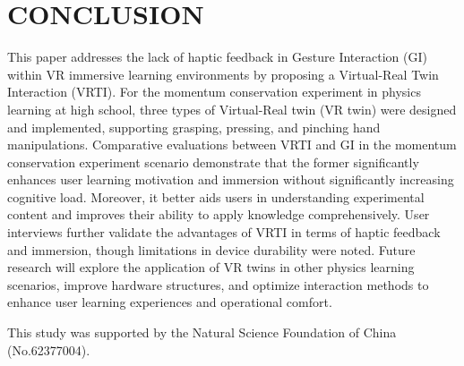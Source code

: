 \documentclass[sigconf,review,anonymous]{acmart}
\begin{document}
\section{CONCLUSION}
This paper addresses the lack of haptic feedback in Gesture Interaction (GI) within VR immersive learning environments by proposing a Virtual-Real Twin Interaction (VRTI). For the momentum conservation experiment in physics learning at high school, three types of Virtual-Real twin (VR twin) were designed and implemented, supporting grasping, pressing, and pinching hand manipulations. Comparative evaluations between VRTI and GI in the momentum conservation experiment scenario demonstrate that the former significantly enhances user learning motivation and immersion without significantly increasing cognitive load. Moreover, it better aids users in understanding experimental content and improves their ability to apply knowledge comprehensively. User interviews further validate the advantages of VRTI in terms of haptic feedback and immersion, though limitations in device durability were noted. Future research will explore the application of VR twins in other physics learning scenarios, improve hardware structures, and optimize interaction methods to enhance user learning experiences and operational comfort.

\begin{acks}
This study was supported by the Natural Science Foundation of China (No.62377004). 
\end{acks}




\end{document}
